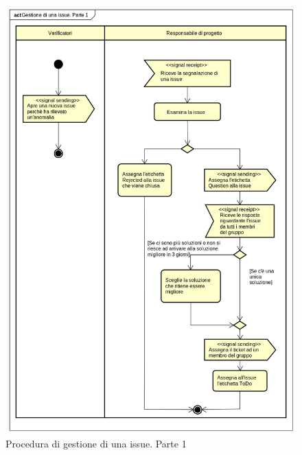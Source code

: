 \documentclass[../NormeProgetto.tex]{subfiles}
\begin{document}
\newpage
				\begin{figure}[H]
					\centering
					\includegraphics[scale= 0.75, width=\textwidth]{sections/img/gestioneIssueP1.png}
					\caption{Procedura di gestione di una issue. Parte 1}\label{fig:Procedura di gestione di una issue parte 1} 
				\end{figure}
\end{document}
